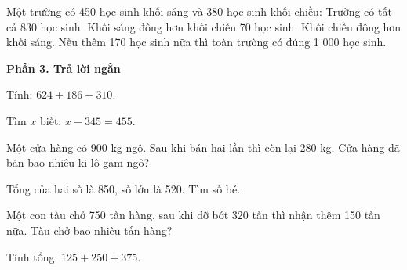\begin{ex} %
Một trường có 450 học sinh khối sáng và 380 học sinh khối chiều:
\choiceTF
{\True Trường có tất cả 830 học sinh.}
{\True Khối sáng đông hơn khối chiều 70 học sinh.}
{Khối chiều đông hơn khối sáng.}
{\True Nếu thêm 170 học sinh nữa thì toàn trường có đúng 1 000 học sinh.}
\end{ex}

\textbf{Phần 3. Trả lời ngắn}

\begin{ex} %
Tính: $624 + 186 - 310$.
\end{ex}

\begin{ex} %
Tìm $x$ biết: $x - 345 = 455$.
\end{ex}

\begin{ex} %
Một cửa hàng có 900 kg ngô. Sau khi bán hai lần thì còn lại 280 kg. Cửa hàng đã bán bao nhiêu ki-lô-gam ngô?
\end{ex}

\begin{ex} %
Tổng của hai số là 850, số lớn là 520. Tìm số bé.
\end{ex}

\begin{ex} %
Một con tàu chở 750 tấn hàng, sau khi dỡ bớt 320 tấn thì nhận thêm 150 tấn nữa. Tàu chở bao nhiêu tấn hàng?
\end{ex}

\begin{ex} %
Tính tổng: $125 + 250 + 375$.
\end{ex}
